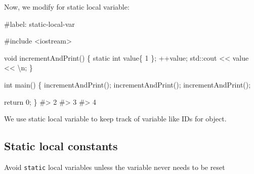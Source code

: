 \documentclass[
  letterpaper,
  DIV=11,
  numbers=noendperiod]{scrreprt}
\newenvironment{Shaded}{\begin{snugshade}}{\end{snugshade}}
\newcommand{\CommentTok}[1]{\textcolor[rgb]{0.37,0.37,0.37}{#1}}
\newcommand{\DecValTok}[1]{\textcolor[rgb]{0.68,0.00,0.00}{#1}}
\newcommand{\ErrorTok}[1]{\textcolor[rgb]{0.68,0.00,0.00}{#1}}
\newcommand{\FunctionTok}[1]{\textcolor[rgb]{0.28,0.35,0.67}{#1}}
\newcommand{\NormalTok}[1]{\textcolor[rgb]{0.00,0.23,0.31}{#1}}
\newcommand{\SpecialCharTok}[1]{\textcolor[rgb]{0.37,0.37,0.37}{#1}}
\newcommand{\StringTok}[1]{\textcolor[rgb]{0.13,0.47,0.30}{#1}}
\begin{document}
Now, we modify for static local variable:

\begin{Shaded}
\begin{Highlighting}[]
\CommentTok{\#label: static{-}local{-}var}

\CommentTok{\#include \textless{}iostream\textgreater{}}

\NormalTok{void }\FunctionTok{incrementAndPrint}\NormalTok{()}
\NormalTok{\{}
\NormalTok{    static int value\{ }\DecValTok{1}\NormalTok{ \};}
    \SpecialCharTok{++}\NormalTok{value;}
\NormalTok{    std}\SpecialCharTok{::}\NormalTok{cout }\SpecialCharTok{\textless{}}\ErrorTok{\textless{}}\NormalTok{ value }\SpecialCharTok{\textless{}}\ErrorTok{\textless{}} \StringTok{\textquotesingle{}}\SpecialCharTok{\textbackslash{}n}\StringTok{\textquotesingle{}}\NormalTok{;}
\NormalTok{\}}

\NormalTok{int }\FunctionTok{main}\NormalTok{()}
\NormalTok{\{}
    \FunctionTok{incrementAndPrint}\NormalTok{();}
    \FunctionTok{incrementAndPrint}\NormalTok{();}
    \FunctionTok{incrementAndPrint}\NormalTok{();}

\NormalTok{    return }\DecValTok{0}\NormalTok{;}
\NormalTok{\}}
\CommentTok{\#\textgreater{} 2}
\CommentTok{\#\textgreater{} 3}
\CommentTok{\#\textgreater{} 4}
\end{Highlighting}
\end{Shaded}

We use static local variable to keep track of variable like IDs for
object.

\hypertarget{static-local-constants}{%
\subsection{Static local constants}\label{static-local-constants}}

\begin{tcolorbox}[enhanced jigsaw, toprule=.15mm, rightrule=.15mm, opacityback=0, breakable, leftrule=.75mm, colback=white, colframe=quarto-callout-tip-color-frame, arc=.35mm, left=2mm, bottomrule=.15mm]
\begin{minipage}[t]{5.5mm}
\textcolor{quarto-callout-tip-color}{\faLightbulb}
\end{minipage}%
\begin{minipage}[t]{\textwidth - 5.5mm}

Avoid \texttt{static} local variables unless the variable never needs to
be reset

\end{minipage}%
\end{tcolorbox}
\end{document}
